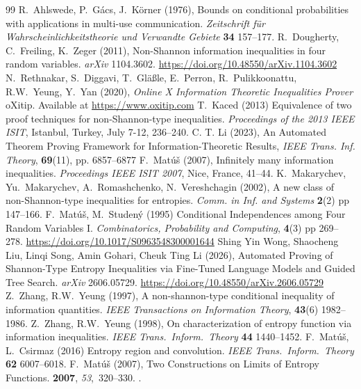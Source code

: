 \documentclass[10pt,a4paper]{amsart}
\begin{document}
\begin{thebibliography}{99}
 R.~Ahlswede, P.~G\'acs, J.~K\"orner (1976), Bounds on conditional probabilities with applications in multi-use communication. \emph{Zeitschrift f\"ur Wahrscheinlichkeitstheorie und Verwandte Gebiete} {\bf 34} 157--177. %
 R.~Dougherty, C.~Freiling, K.~Zeger (2011), {Non-Shannon information inequalities in four random variables}. \emph{arXiv} 1104.3602. \url{https://doi.org/10.48550/arXiv.1104.3602} %
 N.~Rethnakar, S.~Diggavi, T.~Gläßle, E.~Perron, R.~Pulikkoonattu, R.W.~Yeung, Y.~Yan (2020), \emph{Online X Information Theoretic Inequalities Prover} oXitip. Available at \url{https://www.oxitip.com} %
 T.~Kaced (2013) Equivalence of two proof techniques for non-Shannon-type inequalities. \emph{Proceedings of the 2013 {IEEE} ISIT}, Istanbul, Turkey, July 7-12, 236--240. %
 C. T. Li (2023), An Automated Theorem Proving Framework for Infor\-ma\-tion{-}Theoretic Results, \emph{IEEE Trans. Inf. Theory}, {\bf69}(11), pp. 6857--6877 %
 F.~Mat\'{u}\v{s} (2007), Infinitely many information inequalities. \emph{Proceedings IEEE ISIT 2007}, Nice, France, 41--44. %
 K.~Makarychev, Yu.~Makarychev, A.~Romashchenko, N.~Vereshchagin (2002), A new class of non-Shannon-type inequalities for entropies. \emph{Comm. in Inf. and Systems} {\bf 2}(2) pp 147--166. %
 F.~Mat\'u\v{s}, M.~Studen\'y (1995) Conditional Independences among Four Random Variables I. \emph{Combinatorics, Probability and Computing}, {\bf 4}(3) pp 269--278. \url{https://doi.org/10.1017/S0963548300001644} %
 Shing Yin Wong, Shaocheng Liu, Linqi Song, Amin Gohari, Cheuk Ting Li (2026), Automated Proving of Shannon-Type Entropy Inequalities via Fine-Tuned Language Models and Guided Tree Search. \emph{arXiv} 2606.05729. \url{https://doi.org/10.48550/arXiv.2606.05729} %
 Z.~Zhang, R.W.~Yeung (1997), A non-shannon-type conditional inequality of information quantities. \emph{IEEE Transactions on Information Theory}, {\bf 43}(6) 1982--1986. %
 Z.~Zhang, R.W.~Yeung (1998), On characterization of entropy function via information inequalities. \emph{IEEE Trans.\ Inform.\ Theory} {\bf 44} 1440--1452. %
 F.~Mat\'{u}\v{s}, L.~Csirmaz (2016) Entropy region and convolution. \emph{IEEE Trans.\ Inform.\ Theory} {\bf 62} 6007--6018. %
 F.~Mat{\'u}{\v{s}} (2007), \newblock Two Constructions on Limits of Entropy Functions.  {\bf 2007}, {\em 53},~320--330. . %

\end{thebibliography}
\end{document}
